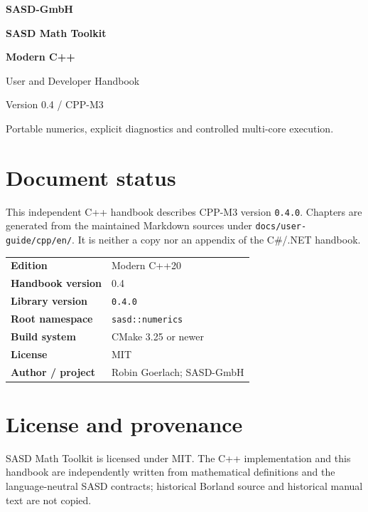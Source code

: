 \documentclass[11pt,a4paper,twoside,openright]{book}
\begin{document}
\frontmatter

\begin{titlepage}
\pagecolor{sasdInk}\color{white}
\vspace*{2cm}
{\sffamily\bfseries\Large SASD-GmbH\par}
\vspace{3cm}
{\bfseries\fontsize{34}{40}\selectfont SASD Math Toolkit\par}
\vspace{0.5cm}
{\color{sasdTeal}\bfseries\fontsize{24}{29}\selectfont Modern C++\par}
\vspace{1cm}
{\Large User and Developer Handbook\par}
{\large Version 0.4 / CPP-M3\par}
\vfill
{\large Portable numerics, explicit diagnostics and controlled multi-core execution.\par}
\vspace{0.8cm}
{\repo\par}
\end{titlepage}
\nopagecolor\color{sasdInk}

\chapter*{Document status}

This independent C++ handbook describes CPP-M3 version \texttt{0.4.0}.
Chapters are generated from the maintained Markdown sources under
\texttt{docs/user-guide/cpp/en/}. It is neither a copy nor an appendix of the
C\#/.NET handbook.

\begin{tabularx}{\textwidth}{@{}>{\bfseries}p{}X@{}}
Edition & Modern C++20\\
Handbook version & 0.4\\
Library version & \texttt{0.4.0}\\
Root namespace & \texttt{sasd::numerics}\\
Build system & CMake 3.25 or newer\\
License & MIT\\
Author / project & Robin Goerlach; SASD-GmbH\\
\end{tabularx}

\tableofcontents
\clearpage
\mainmatter








\backmatter
\chapter*{License and provenance}
SASD Math Toolkit is licensed under MIT. The C++ implementation and this
handbook are independently written from mathematical definitions and the
language-neutral SASD contracts; historical Borland source and historical
manual text are not copied.
\end{document}
